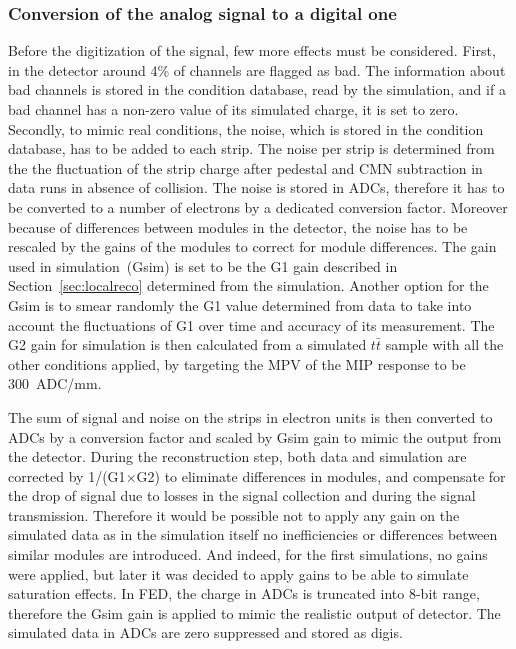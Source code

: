 \subsubsection{Conversion of the analog signal to a digital one~\label{sec:digitize}}

Before the digitization of the signal, few more effects must be considered. First, in the detector around 4\% of channels are flagged as bad. The information about bad channels is stored in the condition database, read by the simulation, and if a bad channel has a non-zero value of its simulated charge, it is set to zero. Secondly, to mimic real conditions, the noise, which is stored in the condition database, has to be added to each strip. The noise per strip is determined from the the fluctuation of the strip charge after pedestal and CMN subtraction in data runs in absence of collision. The noise is stored in ADCs, therefore it has to be converted to a number of electrons by a dedicated conversion factor. Moreover because of differences between modules in the detector, the noise has to be rescaled by the gains of the modules to correct for module differences. The gain used in simulation~(Gsim) is set to be the G1 gain described in Section~\ref{sec:localreco} determined from the simulation. Another option for the Gsim is to smear randomly the G1 value determined from data to take into account the fluctuations of G1 over time and accuracy of its measurement. The G2 gain for simulation is then calculated from a simulated $t\bar{t}$ sample with all the other conditions applied, by targeting the MPV of the MIP response to be 300~ADC/mm.

 The sum of signal and noise on the strips in electron units is then converted to ADCs by a conversion factor and scaled by Gsim gain to mimic the output from the detector. During the reconstruction step, both data and simulation are corrected by 1/(G1$\times$G2) to eliminate differences in modules, and compensate for the drop of signal due to losses in the signal collection and during the signal transmission. Therefore it would be possible not to apply any gain on the simulated data as in the simulation itself no inefficiencies or differences between similar modules are introduced. And indeed, for the first simulations, no gains were applied, but later it was decided to apply gains to be able to simulate saturation effects. In FED, the charge in ADCs is truncated into 8-bit range, therefore the Gsim gain is applied to mimic the realistic output of detector. The simulated data in ADCs are zero suppressed and stored as digis.

